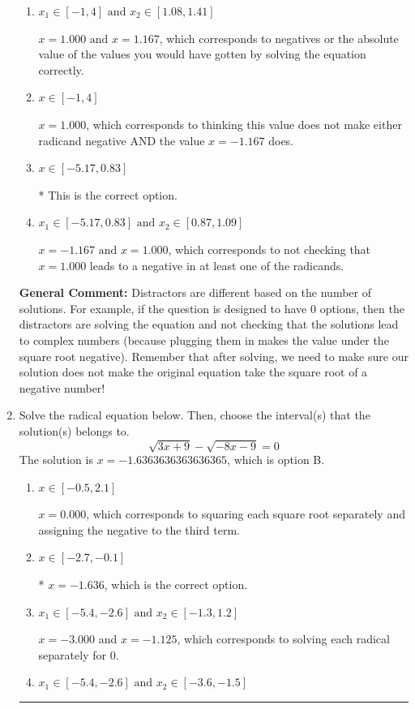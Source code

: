 \documentclass{extbook}[14pt]
\newcommand{\litem}[1]{\item #1

\rule{\textwidth}{0.4pt}}
\begin{document}
\begin{enumerate}
{\begin{enumerate}[label=\Alph*.]
This corresponds to believing both $x = -1.167 \text{ and } x = 1.000$ both lead to complex values.
\item \( x_1 \in [-1, 4] \text{ and } x_2 \in [1.08,1.41] \)

$x = 1.000 \text{ and } x = 1.167$, which corresponds to negatives or the absolute value of the values you would have gotten by solving the equation correctly.
\item \( x \in [-1,4] \)

$x = 1.000$, which corresponds to thinking this value does not make either radicand negative AND the value $x = -1.167$ does.
\item \( x \in [-5.17,0.83] \)

* This is the correct option.
\item \( x_1 \in [-5.17, 0.83] \text{ and } x_2 \in [0.87,1.09] \)

$x = -1.167 \text{ and } x = 1.000$, which corresponds to not checking that $x = 1.000$ leads to a negative in at least one of the radicands.
\end{enumerate}

\textbf{General Comment:} Distractors are different based on the number of solutions. For example, if the question is designed to have 0 options, then the distractors are solving the equation and not checking that the solutions lead to complex numbers (because plugging them in makes the value under the square root negative). Remember that after solving, we need to make sure our solution does not make the original equation take the square root of a negative number!
}
\litem{
Solve the radical equation below. Then, choose the interval(s) that the solution(s) belongs to.
\[ \sqrt{3 x + 9} - \sqrt{-8 x - 9} = 0 \]The solution is \( x = -1.6363636363636365 \), which is option B.\begin{enumerate}[label=\Alph*.]
\item \( x \in [-0.5,2.1] \)

$x = 0.000$, which corresponds to squaring each square root separately and assigning the negative to the third term.
\item \( x \in [-2.7,-0.1] \)

* $x = -1.636$, which is the correct option.
\item \( x_1 \in [-5.4, -2.6] \text{ and } x_2 \in [-1.3,1.2] \)

$x = -3.000$ and $x = -1.125$, which corresponds to solving each radical separately for 0.
\item \( x_1 \in [-5.4, -2.6] \text{ and } x_2 \in [-3.6,-1.5] \)


\end{enumerate}}
\end{enumerate}
\end{document}
